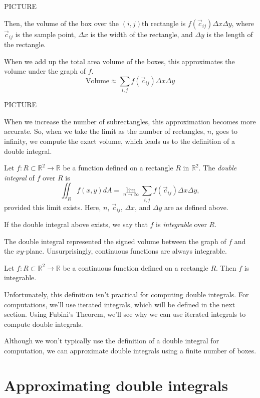 \documentclass{ximera}
\begin{document}
PICTURE

Then, the volume of the box over the $(i,j)$th rectangle is $f(\vec{c}_{ij})\Delta x\Delta y$, where $\vec{c}_{ij}$ is the sample point, $\Delta x$ is the width of the rectangle, and $\Delta y$ is the length of the rectangle.

When we add up the total area volume of the boxes, this approximates the volume under the graph of $f$.
\[
\text{Volume}\approx \sum_{i,j} f(\vec{c}_{ij})\Delta x\Delta y
\]

PICTURE

When we increase the number of subrectangles, this approximation becomes more accurate. So, when we take the limit as the number of rectangles, $n$, goes to infinity, we compute the exact volume, which leads us to the definition of a double integral.

\begin{definition}
Let $f:R\subset\mathbb{R}^2\rightarrow\mathbb{R}$ be a function defined on a rectangle $R$ in $\mathbb{R}^2$. The \emph{double integral} of $f$ over $R$ is
\[
\iint_R f(x,y) dA = \lim_{n\rightarrow \infty} \sum_{i,j} f(\vec{c}_{ij})\Delta x\Delta y,
\]
provided this limit exists. Here, $n$, $\vec{c}_{ij}$, $\Delta x$, and $\Delta y$ are as defined above.

If the double integral above exists, we say that $f$ is \emph{integrable} over $R$.
\end{definition}

The double integral represented the signed volume between the graph of $f$ and the $xy$-plane. Unsurprisingly, continuous functions are always integrable.

\begin{theorem}
Let $f:R\subset\mathbb{R}^2\rightarrow\mathbb{R}$ be a continuous function defined on a rectangle $R$. Then $f$ is integrable.
\end{theorem}

Unfortunately, this definition isn't practical for computing double integrals. For computations, we'll use iterated integrals, which will be defined in the next section. Using Fubini's Theorem, we'll see why we can use iterated integrals to compute double integrals.

Although we won't typically use the definition of a double integral for computation, we can approximate double integrals using a finite number of boxes.

\section*{Approximating double integrals}
\end{document}
